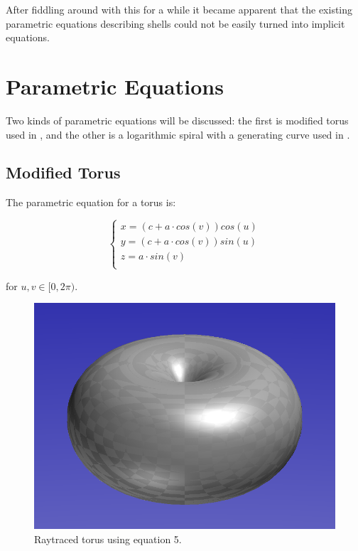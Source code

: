 \documentclass[a4paper]{article}
\begin{document}
After fiddling around with this for a while it became apparent that the existing parametric equations describing shells could not be easily turned into implicit equations.

\section{Parametric Equations}

Two kinds of parametric equations will be discussed: the first is modified torus used in \cite{povray-seashells}, and the other is a logarithmic spiral with a generating curve used in \cite{JORGEPICADO}.

\subsection{Modified Torus}

The parametric equation for a torus is:

\begin{equation}
	\begin{cases}
		x = (c + a \cdot cos(v)) cos(u)\\
		y = (c + a \cdot cos(v)) sin(u)\\
		z = a \cdot sin(v)\\
	\end{cases}
\end{equation}

for $u,v \in  [0, 2\pi)$.

\begin{figure}[h]
	\centering\includegraphics[scale=0.3]{./img/torus.png}
	\caption{Raytraced torus using equation 5.}
	\label{torus} %
\end{figure}
\end{document}
